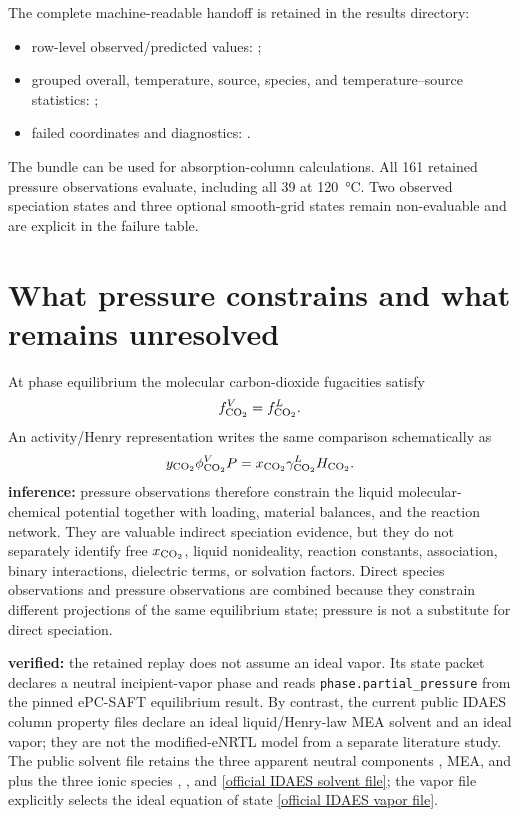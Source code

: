 \documentclass[10pt,oneside]{scrartcl}
\begin{document}
The complete machine-readable handoff is retained in the results directory:
\begin{itemize}
\item row-level observed/predicted values: ;
\item grouped overall, temperature, source, species, and temperature--source
statistics: ;
\item failed coordinates and diagnostics: .
\end{itemize}
The bundle can be used for absorption-column calculations. All 161 retained
pressure observations evaluate, including all 39 at \SI{120}{\celsius}.
Two observed speciation states and three optional smooth-grid states remain
non-evaluable and are explicit in the failure table.

\section{What pressure constrains and what remains unresolved}
\label{sec:pressure-identifiability}

At phase equilibrium the molecular carbon-dioxide fugacities satisfy
\begin{equation}
f_{\ce{CO2}}^{V}=f_{\ce{CO2}}^{L}.
\label{eq:co2-phase-equilibrium}
\end{equation}
An activity/Henry representation writes the same comparison schematically as
\begin{equation}
y_{\ce{CO2}}\phi_{\ce{CO2}}^{V}P
=x_{\ce{CO2}}\gamma_{\ce{CO2}}^{L}H_{\ce{CO2}}.
\label{eq:co2-pressure-constraint}
\end{equation}
\textbf{inference:} pressure observations therefore constrain the liquid
molecular- chemical potential together with loading, material balances,
and the reaction network. They are valuable indirect speciation evidence, but
they do not separately identify free $x_{\ce{CO2}}$, liquid nonideality,
reaction constants, association, binary interactions, dielectric terms, or
solvation factors. Direct species observations and pressure observations are
combined because they constrain different projections of the same equilibrium
state; pressure is not a substitute for direct speciation.

\textbf{verified:} the retained replay does not assume an ideal vapor. Its
state packet declares a neutral incipient-vapor phase and reads
\texttt{phase.partial\_pressure} from the pinned ePC-SAFT equilibrium result.
By contrast, the current public IDAES column property files declare an ideal
liquid/Henry-law MEA solvent and an ideal vapor; they are not the modified-eNRTL
model from a separate literature study. The public solvent file retains the
three apparent neutral components , MEA, and  plus the three
ionic species , , and 
\href{https://github.com/IDAES/idaes-pse/blob/main/idaes/models_extra/column_models/properties/MEA_solvent.py}{[official IDAES solvent file]};
the vapor file explicitly selects the ideal equation of state
\href{https://github.com/IDAES/idaes-pse/blob/main/idaes/models_extra/column_models/properties/MEA_vapor.py}{[official IDAES vapor file]}.
\end{document}
